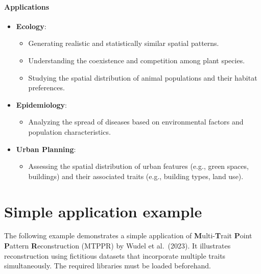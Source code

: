 \documentclass[
  letterpaper,
  DIV=11,
  numbers=noendperiod]{scrreprt}
\providecommand{\tightlist}{%
  \setlength{\itemsep}{0pt}\setlength{\parskip}{0pt}}\usepackage{longtable,booktabs,array}
\begin{document}
\subsubsection*{Applications}\label{applications}

\begin{itemize}
\item
  \textbf{Ecology}:

  \begin{itemize}
  \item
    Generating realistic and statistically similar spatial patterns.
  \item
    Understanding the coexistence and competition among plant species.
  \item
    Studying the spatial distribution of animal populations and their
    habitat preferences.
  \end{itemize}
\item
  \textbf{Epidemiology}:

  \begin{itemize}
  \tightlist
  \item
    Analyzing the spread of diseases based on environmental factors and
    population characteristics.
  \end{itemize}
\item
  \textbf{Urban Planning}:

  \begin{itemize}
  \tightlist
  \item
    Assessing the spatial distribution of urban features (e.g., green
    spaces, buildings) and their associated traits (e.g., building
    types, land use).
  \end{itemize}
\end{itemize}


\chapter{Simple application example}\label{simple-application-example}

The following example demonstrates a simple application of
\textbf{M}ulti-\textbf{T}rait \textbf{P}oint \textbf{P}attern
\textbf{R}econstruction (MTPPR) by Wudel et al.~(2023). It illustrates
reconstruction using fictitious datasets that incorporate multiple
traits simultaneously. The required libraries must be loaded beforehand.
\end{document}
